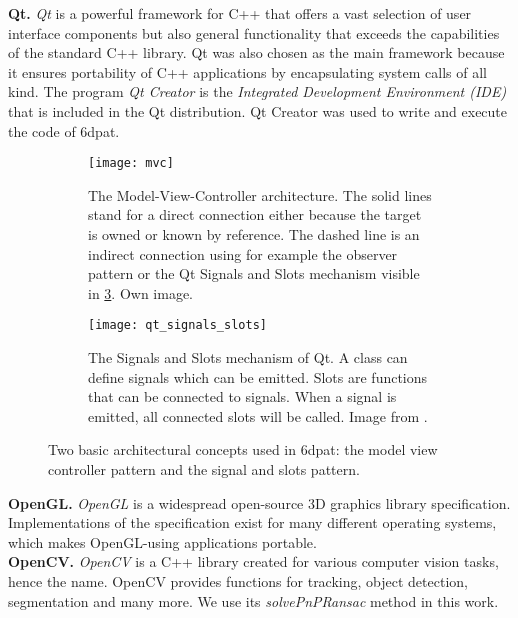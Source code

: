 \noindent\textbf{Qt.} \textit{Qt} \cite{qt} is a powerful framework for C++ that offers a vast selection of user interface components but also general functionality that exceeds the capabilities of the standard C++ library. Qt was also chosen as the main framework because it ensures portability of C++ applications by encapsulating system calls of all kind. The program \textit{Qt Creator} is the \textit{Integrated Development Environment (IDE)} that is included in the Qt distribution. Qt Creator was used to write and execute the code of \gls{6dpat}. \\

\begin{figure}[!tbp]
	\centering
	\begin{subfigure}[t]{0.47\textwidth}
		\centering
    	\texttt{[image: mvc]}
    	\caption{The Model-View-Controller architecture. The solid lines stand for a direct connection either because the target is owned or known by reference. The dashed line is an indirect connection using for example the observer pattern or the Qt Signals and Slots mechanism visible in \fig \ref{fig:qt_signals_slots}. Own image.}
    	\label{fig:mvc}
	\end{subfigure}
	\hfill
	\begin{subfigure}[t]{0.47\textwidth}
	\centering
    	\texttt{[image: qt\_signals\_slots]}
    	\caption{The Signals and Slots mechanism of Qt. A class can define signals which can be emitted. Slots are functions that can be connected to signals. When a signal is emitted, all connected slots will be called. Image from \cite{qt_signals_and_slots}.}
    	\label{fig:qt_signals_slots}
	\end{subfigure}
	\caption{Two basic architectural concepts used in \gls{6dpat}: the model view controller pattern and the signal and slots pattern.}
\end{figure} 

\noindent\textbf{OpenGL.} \textit{OpenGL} \cite{opengl} is a widespread open-source 3D graphics library specification. Implementations of the specification exist for many different operating systems, which makes OpenGL-using applications portable. \\

\noindent\textbf{OpenCV.} \textit{OpenCV} \cite{opencv} is a C++ library created for various computer vision tasks, hence the name. OpenCV provides functions for tracking, object detection, segmentation and many more. We use its \textit{solvePnPRansac} method in this work. \\ 


